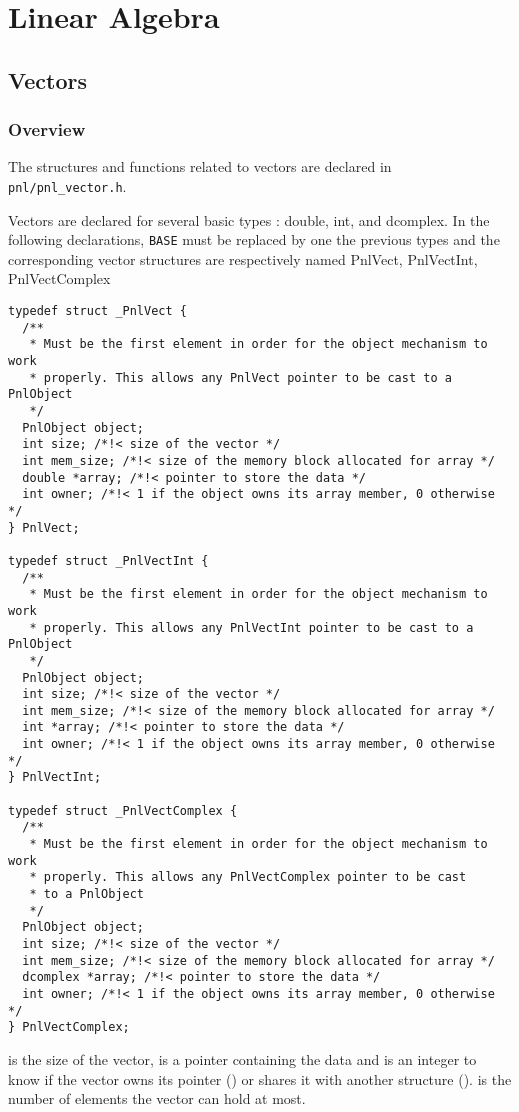 \section{Linear Algebra}

\subsection{Vectors}
\subsubsection{Overview}

The structures and functions related to vectors are declared in
\verb!pnl/pnl_vector.h!.


Vectors are declared for several basic types : double, int, and
dcomplex. In the following declarations, {\tt BASE} must be replaced by one
the previous types and the corresponding vector structures are respectively
named PnlVect, PnlVectInt, PnlVectComplex
\begin{verbatim}
typedef struct _PnlVect {
  /**
   * Must be the first element in order for the object mechanism to work
   * properly. This allows any PnlVect pointer to be cast to a PnlObject
   */
  PnlObject object; 
  int size; /*!< size of the vector */
  int mem_size; /*!< size of the memory block allocated for array */
  double *array; /*!< pointer to store the data */
  int owner; /*!< 1 if the object owns its array member, 0 otherwise */
} PnlVect;

typedef struct _PnlVectInt {
  /**
   * Must be the first element in order for the object mechanism to work
   * properly. This allows any PnlVectInt pointer to be cast to a PnlObject
   */
  PnlObject object; 
  int size; /*!< size of the vector */ 
  int mem_size; /*!< size of the memory block allocated for array */
  int *array; /*!< pointer to store the data */
  int owner; /*!< 1 if the object owns its array member, 0 otherwise */
} PnlVectInt;

typedef struct _PnlVectComplex {
  /**
   * Must be the first element in order for the object mechanism to work
   * properly. This allows any PnlVectComplex pointer to be cast 
   * to a PnlObject
   */
  PnlObject object; 
  int size; /*!< size of the vector */ 
  int mem_size; /*!< size of the memory block allocated for array */
  dcomplex *array; /*!< pointer to store the data */
  int owner; /*!< 1 if the object owns its array member, 0 otherwise */
} PnlVectComplex;
\end{verbatim}
 is the size of the vector,  is a pointer containing the
data and  is an integer to know if the vector owns its 
pointer () or shares it with another structure ().
 is the number of elements the vector can hold at most.

